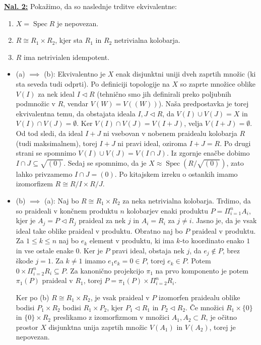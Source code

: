 \documentclass[a4paper, 12pt]{article}
\DeclareMathOperator{\Spec}{Spec}
\newcommand{\subideal}{\vartriangleleft}
\begin{document}
\underline{\textbf{Nal. 2:}}
Pokažimo, da so naslednje trditve ekvivalentne:
\begin{enumerate}[label=(\alph*)]
	\item $X = \Spec R$ je nepovezan.
	\item $R \cong R_1 \times R_2$, kjer sta $R_1$ in $R_2$ netrivialna kolobarja.
	\item $R$ ima netrivialen idempotent.
\end{enumerate}
\begin{itemize}
	\item (a) $\implies$ (b): Ekvivalentno je $X$ enak disjunktni uniji dveh zaprtih množic (ki sta seveda tudi odprti). Po definiciji topologije na $X$ so zaprte množice oblike $V(I)$ za nek ideal $I \subideal R$ (tehnično smo jih definirali preko poljubnih podmnožic v $R$, vendar $V(W) = V((W))$). Naša predpostavka je torej ekvivalentna temu, da obstajata ideala $I, J \subideal R$, da $V(I) \cup V(J) = X$ in $V(I) \cap V(J) = \emptyset$. Ker $V(I) \cap V(J) = V(I + J)$, velja $V(I + J) = \emptyset$. Od tod sledi, da ideal $I + J$ ni vsebovan v nobenem praidealu kolobarja $R$ (tudi maksimalnem), torej $I + J$ ni pravi ideal, oziroma $I + J = R$. Po drugi strani se spomnimo $V(I) \cup V(J) = V(I\cap J)$. Iz zgornje enačbe dobimo $I \cap J \subseteq \sqrt{(0)}$. Sedaj se spomnimo, da je $X \approx \Spec (R/\sqrt{(0)})$, zato lahko privzamemo $I \cap J = (0)$. Po kitajskem izreku o ostankih imamo izomorfizem $R \cong R/I \times R/J$.
	
	\item (b) $\implies$ (a): Naj bo $R \cong R_1 \times R_2$ za neka netrivialna kolobarja. Trdimo, da so praideali v končnem produktu $n$ kolobarjev enaki produktu $P = \Pi_{i=1}^n A_i$, kjer je $A_j = P \subideal R_j$ praideal za nek $j$ in $A_i = R_i$ za $j \neq i$. Jasno je, da je vsak ideal take oblike praideal v produktu.  Obratno naj bo $P$ praideal v produktu. Za $1 \leq k \leq n$ naj bo $e_k$ element v produktu, ki ima $k$-to koordinato enako $1$ in vse ostale enake $0$. Ker je $P$ pravi ideal, obstaja nek $j$, da $e_j \notin P$, brez škode $j=1$. Za $k \neq 1$ imamo $e_1e_k = 0 \in P$, torej $e_k \in P$. Potem $0 \times \Pi_{i=2}^n R_i \subseteq P$. Za kanonično projekcijo $\pi_1$ na prvo komponento je potem $\pi_1(P)$ praideal v $R_1$, torej $P = \pi_1(P) \times \Pi_{i=2}^n R_i$.
	
	Ker po (b) $R \cong R_1 \times R_2$, je vsak praideal v $P$ izomorfen praidealu oblike bodisi $P_1 \times R_2$ bodisi $R_1 \times P_2$, kjer $P_1 \subideal R_1$ in $P_2 \subideal R_2$. Če množici $R_1\times \lbrace 0 \rbrace$ in $\lbrace 0 \rbrace\times R_2$ preslikamo z izomorfizmom v množici $A_1, A_2 \subset R$, je očitno prostor $X$ disjunktna unija zaprtih množic $V(A_1)$ in $V(A_2)$, torej je nepovezan.
	

\end{itemize}
\end{document}
